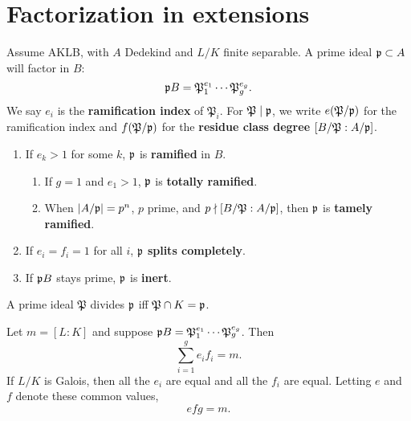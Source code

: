 \section{Factorization in extensions}
Assume AKLB, with $A$ Dedekind and $L/K$ finite separable. A prime ideal $\mathfrak{p}\subset A$ will factor in $B$:
\[
\mathfrak{p} B=\mathfrak P_1^{e_1}\cdots \mathfrak P_g^{e_g}.
\]
We say $e_i$ is the \textbf{ramification index} of $\mathfrak P_i$. 
For $\mathfrak P\mid \mathfrak{p}$, we write $e(\mathfrak P/\mathfrak{p})$ for the ramification index and $f(\mathfrak P/\mathfrak{p})$ for the \textbf{residue class degree} $[B/\mathfrak P:A/\mathfrak{p}]$.
\begin{enumerate}
\item If $e_k>1$ for some $k$, $\mathfrak{p}$ is \textbf{ramified} in $B$.
\begin{enumerate}
\item
If $g=1$ and $e_1>1$, $\mathfrak{p}$ is \textbf{totally ramified}.
\item When $|A/\mathfrak{p}|=p^n$, $p$ prime, and $p\nmid [B/\mathfrak{P}:A/\mathfrak{p}]$, then $\mathfrak{p}$ is \textbf{tamely ramified}.
\end{enumerate}
\item If $e_i=f_i=1$ for all $i$, $\mathfrak{p}$ \textbf{splits completely}.
\item If $\mathfrak{p} B$ stays prime, $\mathfrak{p}$ is \textbf{inert}.
\end{enumerate}
\begin{lem}
A prime ideal $\mathfrak P$ divides $\mathfrak{p}$ iff $\mathfrak P\cap K=\mathfrak{p}$.
\end{lem}
\begin{thm}
Let $m=[L:K]$ and suppose $\mathfrak{p} B=\mathfrak P_1^{e_1}\cdots \mathfrak P_g^{e_g}$. Then
\[
\sum_{i=1}^g e_if_i=m.
\]
If $L/K$ is Galois, then all the $e_i$ are equal and all the $f_i$ are equal. Letting $e$ and $f$ denote these common values,
\[
efg=m.
\]
\end{thm}
